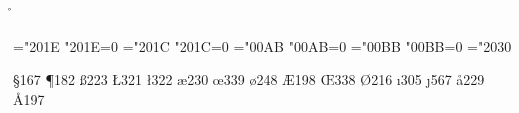 \ifx\r\undefined \else \csaccents \fi  %

\chardef\clqq="201E   \sfcode"201E=0
\chardef\crqq="201C   \sfcode"201C=0
\chardef\flqq="00AB   \sfcode"00AB=0
\chardef\frqq="00BB   \sfcode"00BB=0
\def\ogonek #1{\setbox0\hbox{#1}\ifdim\ht0=1ex\accent"02DB #1%
   \else{\ooalign{\unhbox0\crcr\hss\char"02DB}}\fi}
\chardef\promile="2030
\let\extrahyphenchar=\undefined
\let\extrahyphens=\undefined
\def\uv{\bgroup\aftergroup\closequotes\leavevmode
        \afterassignment\clqq\let\next=}
\def\closequotes{\unskip\crqq\relax}


\chardef \S  167
\chardef \P  182
\chardef \ss 223
\chardef \L  321
\chardef \l  322
\chardef \ae 230   
\chardef \oe 339
\chardef \o  248 
\chardef \AE 198   
\chardef \OE 338    
\chardef \O  216   
\chardef \i  305
\chardef \j  567
\chardef \aa 229
\chardef \AA 197   


\chardef {}
\chardef {}
\chardef {}
\chardef {}
\chardef {}
\chardef {}
\chardef {}
\chardef {}
\chardef {}
\chardef {}
\chardef {}
\chardef {}
\chardef {}  
\let\pound=\sterling


\ifx\mubytein\undefined \expandafter \endinput \fi
\ifnum\mubytein=0 \expandafter \endinput \fi




\endinput


